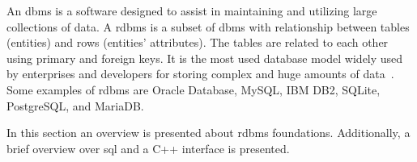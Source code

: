 An \gls{dbms} is a software designed to assist in maintaining and utilizing
large collections of data.
A \gls{rdbms} is a subset of \gls{dbms} with relationship between tables (entities)
and rows (entities' attributes). The tables are related to each other
using primary and foreign keys. It is the most used database model widely used
by enterprises and developers for storing complex and huge amounts of
data~\cite{ramakrishnan2003database}. Some examples of \gls{rdbms} are Oracle
Database, MySQL, IBM DB2, SQLite, PostgreSQL, and MariaDB.


In this section an overview is presented about \gls{rdbms} foundations. Additionally, a brief overview over \gls{sql} and a C++ interface is presented.


